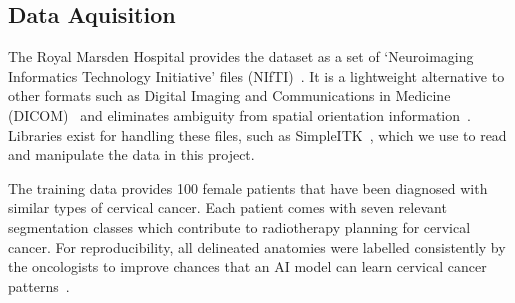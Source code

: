 \documentclass[12pt,twoside]{report}
\begin{document}
\subsection{Data Aquisition}

The Royal Marsden Hospital provides the dataset as a set of `Neuroimaging Informatics Technology Initiative' files (NIfTI)~\cite{file-formats}. It is a lightweight alternative to other formats such as Digital Imaging and Communications in Medicine (DICOM)~\cite{file-formats} and eliminates ambiguity from spatial orientation information~\cite{dicom-to-nifti-conversion}. Libraries exist for handling these files, such as SimpleITK~\cite{SimpleITK-paper}, which we use to read and manipulate the data in this project. %

The training data provides 100 female patients that have been diagnosed with similar types of cervical cancer. Each patient comes with seven relevant segmentation classes which contribute to radiotherapy planning for cervical cancer. For reproducibility, all delineated anatomies were labelled consistently by the oncologists to improve chances that an AI model can learn cervical cancer patterns~\cite{AMLART-data}. 




\end{document}
